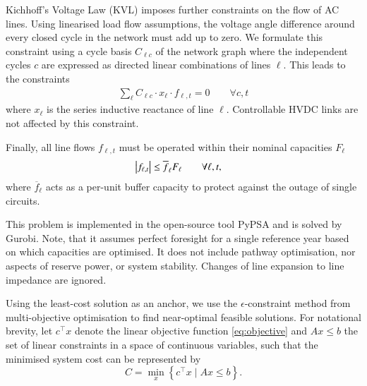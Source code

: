 Kichhoff's Voltage Law (KVL) imposes further constraints on the flow of AC lines.
Using linearised load flow assumptions, the voltage angle difference around every closed cycle in the
network must add up to zero. We formulate this constraint using a cycle basis $C_{\ell c}$
of the network graph where the independent cycles $c$ are expressed as
directed linear combinations of lines $\ell$.\cite{cycleflows}
This leads to the constraints
\begin{align}
    \sum_\ell C_{\ell c} \cdot x_\ell \cdot f_{\ell,t} = 0 \qquad\forall c,t
    \label{eq:kvl}
\end{align}
where $x_\ell$ is the series inductive reactance of line $\ell$.
Controllable HVDC links are not affected by this constraint.

Finally, all line flows $f_{\ell,t}$ must be operated within their nominal capacities $F_\ell$
\begin{align}
    \left|f_{\ell,t}\right| \leq \overline{f}_{\ell} F_{\ell} & \qquad\forall \ell, t,
    \label{eq:lastA}
\end{align}
where $\overline{f}_\ell$ acts as a per-unit buffer capacity
to protect against the outage of single circuits.

This problem is implemented in the open-source tool PyPSA\cite{pypsa} and is solved by Gurobi.
Note, that it assumes perfect foresight for a single reference year based on which capacities are optimised.
It does not include pathway optimisation, nor aspects of reserve power, or system stability.
Changes of line expansion to line impedance are ignored.


Using the least-cost solution as an anchor, we use the
$\epsilon$-constraint method from multi-objective optimisation
to find near-optimal feasible solutions.\cite{nearoptimal,mavrotas_effective_2009}
For notational brevity, let $c^\top x$ denote the linear objective function \cref{eq:objective}
and $Ax\leq b$ the set of linear constraints 
in a space of continuous variables,
such that the minimised system cost can be represented by
\begin{equation}
    C = \min_x\left\{c^\top x \mid Ax\leq b\right\}.
\end{equation}


